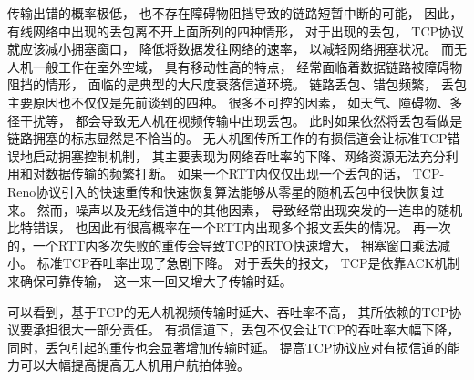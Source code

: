 传输出错的概率极低，
也不存在障碍物阻挡导致的链路短暂中断的可能，
因此，有线网络中出现的丢包离不开上面所列的四种情形，
对于出现的丢包，
TCP协议就应该减小拥塞窗口，
降低将数据发往网络的速率，
以减轻网络拥塞状况。
而无人机一般工作在室外空域，
具有移动性高的特点，
经常面临着数据链路被障碍物阻挡的情形，
面临的是典型的大尺度衰落信道环境。
链路丢包、错包频繁，
丢包主要原因也不仅仅是先前谈到的四种。
很多不可控的因素，
如天气、障碍物、多径干扰等，
都会导致无人机在视频传输中出现丢包。
此时如果依然将丢包看做是链路拥塞的标志显然是不恰当的。
无人机图传所工作的有损信道会让标准TCP错误地启动拥塞控制机制，
其主要表现为网络吞吐率的下降、网络资源无法充分利用和对数据传输的频繁打断。
如果一个RTT内仅仅出现一个丢包的话，
TCP-Reno协议引入的快速重传和快速恢复算法能够从零星的随机丢包中很快恢复过来。
然而，噪声以及无线信道中的其他因素，
导致经常出现突发的一连串的随机比特错误，
也因此有很高概率在一个RTT内出现多个报文丢失的情况。
再一次的，一个RTT内多次失败的重传会导致TCP的RTO快速增大，
拥塞窗口乘法减小。
标准TCP吞吐率出现了急剧下降。
对于丢失的报文，
TCP是依靠ACK机制来确保可靠传输，
这一来一回又增大了传输时延。
\par
可以看到，基于TCP的无人机视频传输时延大、吞吐率不高，
其所依赖的TCP协议要承担很大一部分责任。
有损信道下，丢包不仅会让TCP的吞吐率大幅下降，
同时，丢包引起的重传也会显著增加传输时延。
提高TCP协议应对有损信道的能力可以大幅提高提高无人机用户航拍体验。

